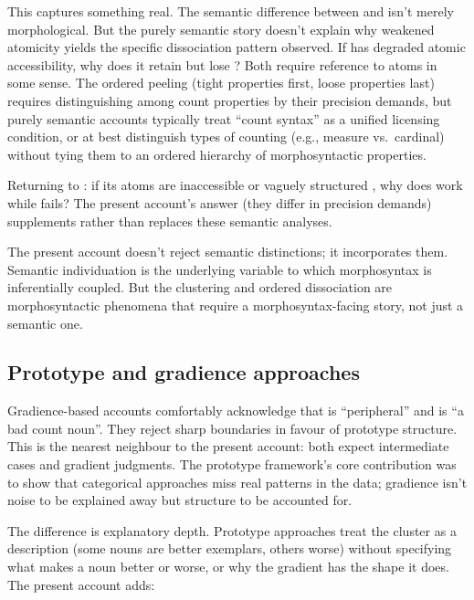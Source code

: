 \documentclass[12pt,a4paper]{article}
\begin{document}
This captures something real. The semantic difference between  and  isn't merely morphological. But the purely semantic story doesn't explain why weakened atomicity yields the specific dissociation pattern observed. If  has degraded atomic accessibility, why does it retain  but lose ? Both require reference to atoms in some sense. The ordered peeling (tight properties first, loose properties last) requires distinguishing among count properties by their precision demands, but purely semantic accounts typically treat \enquote{count syntax} as a unified licensing condition, or at best distinguish types of counting (e.g., measure vs.\ cardinal) without tying them to an ordered hierarchy of morphosyntactic properties.

Returning to : if its atoms are inaccessible \citep{grimm2018} or vaguely structured \citep{rothstein2010}, why does  work while  fails? The present account's answer (they differ in precision demands) supplements rather than replaces these semantic analyses.

The present account doesn't reject semantic distinctions; it incorporates them. Semantic individuation is the underlying variable to which morphosyntax is inferentially coupled. But the clustering and ordered dissociation are morphosyntactic phenomena that require a morphosyntax-facing story, not just a semantic one.

\subsection{Prototype and gradience approaches}

Gradience-based accounts \citep{taylor2003} comfortably acknowledge that  is \enquote{peripheral} and  is \enquote{a bad count noun}. They reject sharp boundaries in favour of prototype structure. This is the nearest neighbour to the present account: both expect intermediate cases and gradient judgments. The prototype framework's core contribution was to show that categorical approaches miss real patterns in the data; gradience isn't noise to be explained away but structure to be accounted for.

The difference is explanatory depth. Prototype approaches treat the cluster as a description (some nouns are better exemplars, others worse) without specifying what makes a noun better or worse, or why the gradient has the shape it does. The present account adds:
\end{document}
